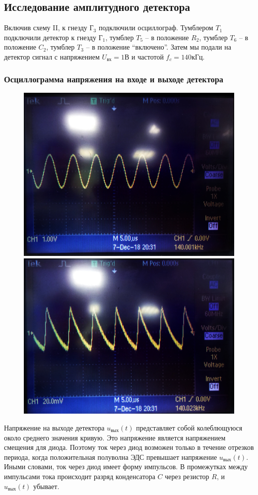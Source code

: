 \subsection{Исследование амплитудного детектора}
Включив схему II, к гнезду $\text{Г}_3$ подключили осциллограф. Тумблером $T_1$ подключили детектор к гнезду $\text{Г}_1$, тумблер $T_5$ -- в положение $R_2$, тумблер $T_6$ -- в положение $C_2$, тумблер $T_3$ -- в положение “включено”. Затем мы подали на детектор сигнал с напряжением $U_{\text{вх}} = 1 \text{В}$ и частотой $f_c = 140 \text{кГц}$.
\subsubsection{Осциллограмма напряжения на входе и выходе детектора}
\begin{figure}[h!]
	\begin{minipage}{0.49\linewidth}
		\centering
		\includegraphics[width=0.8\linewidth]{photo/311.jpg}
		\caption{}
		\label{photo:3.1.1}
	\end{minipage}
	\begin{minipage}{0.49\linewidth}
		\centering
		\includegraphics[width=0.8\linewidth]{photo/312.jpg}
		\caption{}
		\label{photo:3.1.2}
	\end{minipage}
\end{figure}
Напряжение на выходе детектора $u_\text{вых}(t)$ представляет собой колеблющуюся около среднего значения кривую. Это напряжение является напряжением смещения для диода. Поэтому ток через диод возможен только в течение отрезков периода, когда положительная полуволна ЭДС превышает напряжение $u_\text{вых}(t)$. Иными словами, ток через диод имеет форму импульсов. В промежутках между импульсами тока происходит разряд конденсатора $C$ через резистор $R$, и $u_\text{вых}(t)$ убывает.
